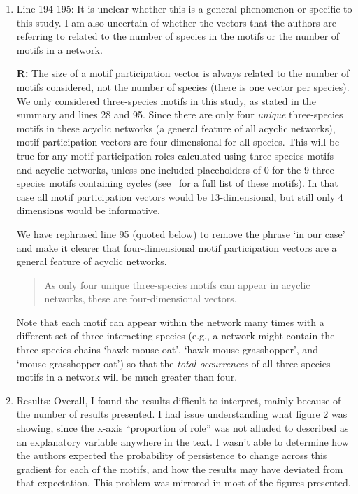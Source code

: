 \documentclass[12pt]{article}
\begin{document}
\begin{enumerate}
            \item Line 194-195: It is unclear whether this is a general phenomenon or specific to this study. I am also uncertain of whether the vectors that the authors are referring to related to the number of species in the motifs or the number of motifs in a network.

                \textbf{R:} The size of a motif participation vector is always related to the number of motifs considered, not the number of species (there is one vector per species). We only considered three-species motifs in this study, as stated in the summary and lines 28 and 95. Since there are only four \emph{unique} three-species motifs in these acyclic networks (a general feature of all acyclic networks), motif participation vectors are four-dimensional for all species. This will be true for any motif participation roles calculated using three-species motifs and acyclic networks, unless one included placeholders of 0 for the 9 three-species motifs containing cycles (see~\citep{Stouffer2007} for a full list of these motifs). In that case all motif participation vectors would be 13-dimensional, but still only 4 dimensions would be informative.


                We have rephrased line 95 (quoted below) to remove the phrase `in our case' and make it clearer that four-dimensional motif participation vectors are a general feature of acyclic networks.
                \begin{quotation}
                    As only four unique three-species motifs can appear in acyclic networks, these are four-dimensional vectors. 
                \end{quotation}

                Note that each motif can appear within the network many times with a different set of three interacting species (e.g., a network might contain the three-species-chains `hawk-mouse-oat',  `hawk-mouse-grasshopper', and `mouse-grasshopper-oat') so that the \emph{total occurrences} of all three-species motifs in a network will be much greater than four.


            \item Results: Overall, I found the results difficult to interpret, mainly because of the number of results presented. I had issue understanding what figure 2 was showing, since the x-axis ``proportion of role'' was not alluded to described as an explanatory variable anywhere in the text. I wasn't able to determine how the authors expected the probability of persistence to change across this gradient for each of the motifs, and how the results may have deviated from that expectation. This problem was mirrored in most of the figures presented.


\end{enumerate}
\end{document}
